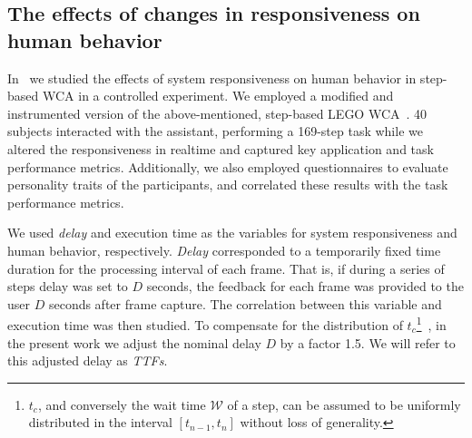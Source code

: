 

\subsection{The effects of changes in responsiveness on human behavior}\label{ssec:plos}

In~\cite{olguinmunoz:impact2021} we studied the effects of system responsiveness on human behavior in step-based \gls{WCA} in a controlled experiment.
We employed a modified and instrumented version of the above-mentioned, step-based LEGO \gls{WCA}~\cite{Chen2015LEGO}.
\num{40} subjects interacted with the assistant, performing a \num{169}-step task while we altered the responsiveness in realtime and captured key application and task performance metrics.
Additionally, we also employed questionnaires to evaluate personality traits of the participants, and correlated these results with the task performance metrics.

We used \emph{delay} and execution time as the variables for system responsiveness and human behavior, respectively.
\emph{Delay} corresponded to a temporarily fixed time duration for the processing interval of each frame.
That is, if during a series of steps delay was set to \( D \) seconds, the feedback for each frame was provided to the user \( D \) seconds after frame capture.
The correlation between this variable and execution time was then studied.
To compensate for the distribution of \( t_c \)\footnote{\( t_c \), and conversely the wait time \( \mathcal{W} \) of a step, can be assumed to be uniformly distributed in the interval \( [t_{n - 1}, t_n] \) without loss of generality.}~\cite{olguinmunoz:impact2021}, in the present work we adjust the nominal delay \( D \) by a factor \num{1.5}.
We will refer to this adjusted delay as \emph{\glspl{TTF}}.

